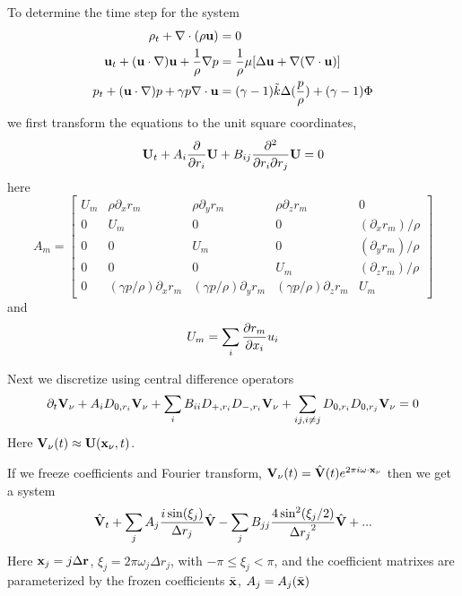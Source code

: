 \documentclass[10pt]{article}
\begin{document}
To determine the time step for the system
\begin{align*}
   \rho_t + \nabla\cdot(\rho {\bf u}) &= 0 \\
   {\bf u}_t + ({\bf u}\cdot\nabla){\bf u} + {1\over\rho}\nabla p &= {1\over\rho} \mu [\Delta {\bf u} + \nabla(\nabla\cdot{\bf u}) ] \\
   p_t + ({\bf u}\cdot\nabla) p + \gamma p \nabla\cdot{\bf u} &= 
           (\gamma-1)\tilde{k} \Delta({p\over \rho}) +(\gamma-1) \Phi
\end{align*}
we first transform the equations to the unit square coordinates,
\[
  {\bf U}_t + A_i {\partial \over \partial r_i} {\bf U} 
     + B_{ij} {\partial^2 \over \partial r_i \partial r_j} {\bf U} = 0
\]
here
\[
A_m =
\begin{bmatrix} 
            U_m & \rho \partial_x r_m & \rho \partial_y r_m & \rho \partial_z r_m & 0 \\
            0   & U_m                 & 0                   & 0                   & (\partial_x r_m)/\rho \\ 
            0   & 0                   & U_m                 & 0                   & (\partial_y r_m)/\rho \\
            0   & 0                   & 0                   & U_m                 & (\partial_z r_m)/\rho \\
            0   & (\gamma p/\rho)\partial_x r_m & (\gamma p/\rho)\partial_y r_m &(\gamma p/\rho)\partial_z r_m  & U_m
\end{bmatrix}
\]
and
\[
    U_m =  \sum_i {\partial r_m \over \partial x_i} u_i 
\]

Next we discretize using central difference operators
\[
  \partial_ t {\bf V}_\nu + A_i D_{0,r_i} {\bf V}_\nu
     + \sum_i B_{ii} D_{+,r_i} D_{-,r_i}{\bf V}_\nu + \sum_{ij,i\ne j} D_{0,r_i} D_{0,r_j} {\bf V}_\nu = 0
\]
Here ${\bf V}_\nu(t)\approx {\bf U}({\bf x}_\nu,t)$.


\newcommand{\omegav}{{\bf\omega}}
If we freeze coefficients and Fourier transform, $\Vv_\nu(t) = \hat{\Vv}(t)e^{2\pi i \omegav\cdot\xv_\nu}$ 
 then we get a system
\[
   \hat{{\bf V}}_t + \sum_j A_j {i\sin(\xi_j) \over \Delta r_j} \hat{{\bf V}}
     - \sum_j B_{jj} {4 \sin^2( \xi_j/2) \over {\Delta r_j}^2 } \hat{{\bf V}} + ...
\]
Here ${\bf x}_j = j \Delta {\bf r}$, $\xi_j = 2\pi\omega_j \Delta r_j$, with $-\pi \le \xi_j < \pi$, and the
coefficient matrixes are parameterized by the frozen coefficients $\bar{{\bf x}}$, $A_j=A_j(\bar{{\bf x}})$
\end{document}
